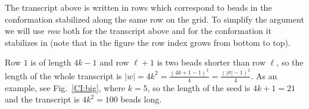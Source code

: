 %	
%		     
%	

The transcript above is written in rows which correspond to beads in the conformation stabilized along the same row on the grid. To simplify the argument we will use \textit{row} both for the transcript above and for the conformation it stabilizes in (note that in the figure the row index grows from bottom to top). 

Row $1$ is of length $4k-1$ and row $\ell+1$ is two beads shorter than row $\ell$, so the length of the whole transcript is $|w|=4k^2=\frac{(4k+1-1)^2}{4}=\frac{(|\sigma|-1)^2}{4}$. As an example, see Fig.~\ref{CI:big}, where $k=5$, so the length of the seed is $4k+1=21$ and the transcript is $4k^2 = 100$ beads long.

